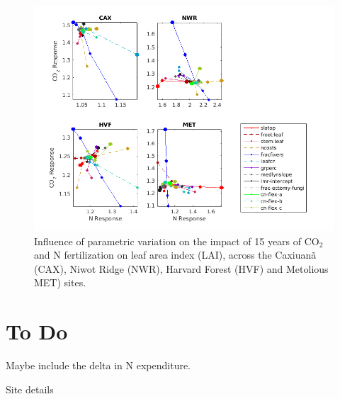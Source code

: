 \documentclass[draft,linenumbers]{agujournal}
\begin{document}
  \begin{figure}[h]
     \centering
     \includegraphics[width=1.55\textwidth, left]{matlab/figures/NOVc_CNdep_TLAI1__p2012.png}
     \caption{Influence of parametric variation on the impact of 15 years of CO$_{2}$ and N fertilization on leaf area index (LAI), across the Caxiuan\~a (CAX), Niwot Ridge (NWR), Harvard Forest (HVF) and Metolious MET) sites.}
     \label{LAI CO2 and N respones 2001}
  \end{figure}
  


\section{To Do}
Maybe include the delta in N expenditure. 

Site details
\end{document}
